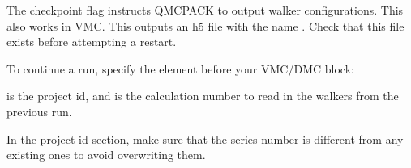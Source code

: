\documentclass[letterpaper,10pt,english]{sphinxmanual}
\begin{document}
The checkpoint flag instructs QMCPACK to output walker configurations.  This also
works in VMC.  This outputs an h5 file with the name .
Check that this file exists before attempting a restart.

To continue a run, specify the  element before your VMC/DMC block:
\def\sphinxLiteralBlockLabel{\label{\detokenize{methods:listing-43}}}
\begin{sphinxVerbatim}[commandchars=\\\{\}]
   
     
               
                  
                    
\end{sphinxVerbatim}

 is the project id, and  is the calculation number to read in the walkers from the previous run.

In the project id section, make sure that the series number is different from any existing ones to avoid overwriting them.
\end{document}
